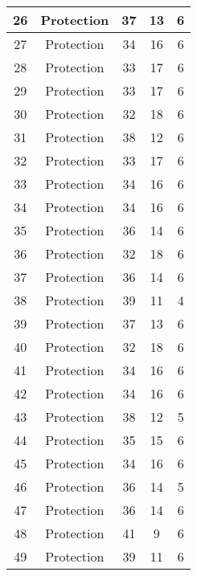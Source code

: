 \documentclass[results.tex]{subfiles}
\begin{document}
\begin{center}
\begin{tabular}{| c || c | c | c | c |}
    \hline
    26 & Protection & 37 & 13 & 6 \\ 
    \hline
    27 & Protection & 34 & 16 & 6 \\ 
    \hline
    28 & Protection & 33 & 17 & 6 \\ 
    \hline
    29 & Protection & 33 & 17 & 6 \\ 
    \hline
    30 & Protection & 32 & 18 & 6 \\ 
    \hline
    31 & Protection & 38 & 12 & 6 \\ 
    \hline
    32 & Protection & 33 & 17 & 6 \\ 
    \hline
    33 & Protection & 34 & 16 & 6 \\ 
    \hline
    34 & Protection & 34 & 16 & 6 \\ 
    \hline
    35 & Protection & 36 & 14 & 6 \\ 
    \hline
    36 & Protection & 32 & 18 & 6 \\ 
    \hline
    37 & Protection & 36 & 14 & 6 \\ 
    \hline
    38 & Protection & 39 & 11 & 4 \\ 
    \hline
    39 & Protection & 37 & 13 & 6 \\ 
    \hline
    40 & Protection & 32 & 18 & 6 \\ 
    \hline
    41 & Protection & 34 & 16 & 6 \\ 
    \hline
    42 & Protection & 34 & 16 & 6 \\ 
    \hline
    43 & Protection & 38 & 12 & 5 \\ 
    \hline
    44 & Protection & 35 & 15 & 6 \\ 
    \hline
    45 & Protection & 34 & 16 & 6 \\ 
    \hline
    46 & Protection & 36 & 14 & 5 \\ 
    \hline
    47 & Protection & 36 & 14 & 6 \\ 
    \hline
    48 & Protection & 41 & 9 & 6 \\ 
    \hline
    49 & Protection & 39 & 11 & 6 \\ 
    \hline   \end{tabular}
\end{center}
\end{document}
